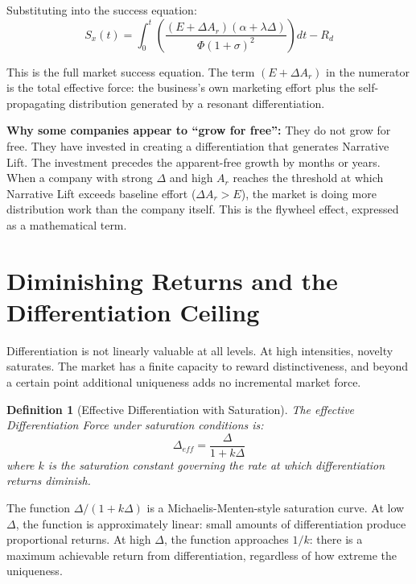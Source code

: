 \documentclass[12pt, openany]{book}
\theoremstyle{thmstyle}
\theoremstyle{defstyle}
\newtheorem{definition}{Definition}[chapter]
\begin{document}
Substituting into the success equation:
\begin{equation}
S_x(t) = \int_0^t \left(\frac{(E + \Delta A_r)(\alpha + \lambda\Delta)}{\Phi(1+\sigma)^2}\right) dt - R_d
\label{eq:success_full}
\end{equation}

This is the full market success equation. The term $(E + \Delta A_r)$ in the numerator is the total effective force: the business's own marketing effort plus the self-propagating distribution generated by a resonant differentiation.

\textbf{Why some companies appear to ``grow for free'':} They do not grow for free. They have invested in creating a differentiation that generates Narrative Lift. The investment precedes the apparent-free growth by months or years. When a company with strong $\Delta$ and high $A_r$ reaches the threshold at which Narrative Lift exceeds baseline effort ($\Delta A_r > E$), the market is doing more distribution work than the company itself. This is the flywheel effect, expressed as a mathematical term.

\section{Diminishing Returns and the Differentiation Ceiling}

Differentiation is not linearly valuable at all levels. At high intensities, novelty saturates. The market has a finite capacity to reward distinctiveness, and beyond a certain point additional uniqueness adds no incremental market force.

\begin{definition}[Effective Differentiation with Saturation]
The effective Differentiation Force under saturation conditions is:
\begin{equation}
\Delta_{eff} = \frac{\Delta}{1 + k\Delta}
\label{eq:delta_eff}
\end{equation}
where $k$ is the saturation constant governing the rate at which differentiation returns diminish.
\end{definition}

The function $\Delta/(1+k\Delta)$ is a Michaelis-Menten-style saturation curve. At low $\Delta$, the function is approximately linear: small amounts of differentiation produce proportional returns. At high $\Delta$, the function approaches $1/k$: there is a maximum achievable return from differentiation, regardless of how extreme the uniqueness.
\end{document}
